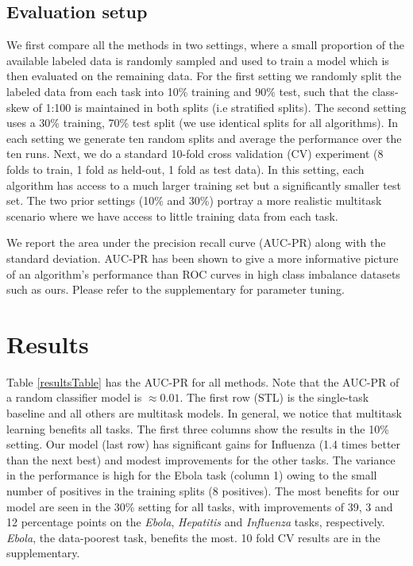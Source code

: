 \documentclass[runningheads,a4paper]{llncs}
\begin{document}
\subsection{Evaluation setup}
We first compare all the methods in two settings, where a small proportion of the available labeled data is randomly sampled and used to train a model which is then evaluated on the remaining data. For the first setting we randomly split the labeled data from each task into 10\% training and 90\% test, such that the class-skew of 1:100 is maintained in both splits (i.e stratified splits). The second setting uses a 30\% training, 70\% test split (we use identical splits for all algorithms). 
In each setting we generate ten random splits and average the performance over the ten runs.
Next, we do a standard 10-fold cross validation (CV) experiment (8 folds to train, 1 fold as held-out, 1 fold as test data). In this setting, each algorithm has access to a much larger training set but a significantly smaller test set. The two prior settings (10\% and 30\%) portray a more realistic multitask scenario where we have access to little training data from each task.

We report the area under the precision recall curve (AUC-PR) along with the standard deviation. 
AUC-PR has been shown to give a more informative picture of an algorithm's performance than ROC curves in high class imbalance datasets \cite{davis2006} such as ours. Please refer to the supplementary for parameter tuning.

\section{Results}
Table \ref{resultsTable} has the AUC-PR for all methods. 
Note that the AUC-PR of a random classifier model is $\approx 0.01$.
The first row (STL) is the single-task baseline and all others are multitask models. In general, we notice that multitask learning benefits
all tasks. The first three columns show the results in the 10\% setting. 
Our model (last row) has significant gains for Influenza (1.4 times better than the next best) and modest improvements for the other tasks.
The variance in the performance is high for the Ebola task (column 1) owing to the small number of positives 
in the training splits (8 positives).
The most benefits for our model are seen in the 30\% setting for all tasks, with 
improvements of 39, 3 and 12 percentage points on the \textit{Ebola}, \textit{Hepatitis} and \textit{Influenza} tasks, respectively. \textit{Ebola}, the data-poorest task, benefits the most.
10 fold CV results are in the supplementary.
\end{document}
